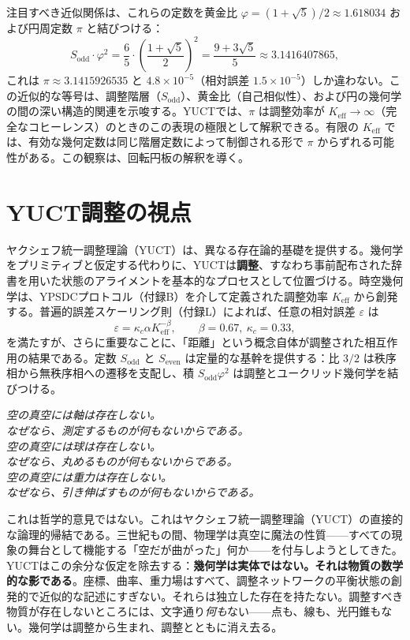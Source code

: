 \documentclass[12pt,a4paper]{article}
\newcommand{\kappac}{\kappa_c}
\newcommand{\eps}{\varepsilon}
\newcommand{\betaf}{\beta}
\newcommand{\Sodd}{S_{\mathrm{odd}}}
\newcommand{\Seven}{S_{\mathrm{even}}}
\begin{document}
	注目すべき近似関係は、これらの定数を黄金比 \(\varphi = (1+\sqrt{5})/2 \approx 1.618034\) および円周定数 \(\pi\) と結びつける：
	\begin{equation}
		\Sodd \cdot \varphi^2 = \frac{6}{5} \cdot \left(\frac{1+\sqrt{5}}{2}\right)^2 = \frac{9+3\sqrt{5}}{5} \approx 3.1416407865,
	\end{equation}
	これは \(\pi \approx 3.1415926535\) と \(4.8\times10^{-5}\)（相対誤差 \(1.5\times10^{-5}\)）しか違わない。この近似的な等号は、調整階層（\(\Sodd\)）、黄金比（自己相似性）、および円の幾何学の間の深い構造的関連を示唆する。YUCTでは、\(\pi\) は調整効率が \(K_{\mathrm{eff}} \to \infty\)（完全なコヒーレンス）のときのこの表現の極限として解釈できる。有限の \(K_{\mathrm{eff}}\) では、有効な幾何定数は同じ階層定数によって制御される形で \(\pi\) からずれる可能性がある。この観察は、回転円板の解釈を導く。
	
	\section{YUCT調整の視点}
	\label{sec:yuct}
	
	ヤクシェフ統一調整理論（YUCT）は、異なる存在論的基礎を提供する。幾何学をプリミティブと仮定する代わりに、YUCTは\textbf{調整}、すなわち事前配布された辞書を用いた状態のアライメントを基本的なプロセスとして位置づける。時空幾何学は、YPSDCプロトコル（付録B）を介して定義された調整効率 \(K_{\mathrm{eff}}\) から創発する。普遍的誤差スケーリング則（付録L）によれば、任意の相対誤差 \(\eps\) は
	\[
	\eps = \kappac \alpha K_{\mathrm{eff}}^{-\betaf}, \qquad \betaf = 0.67,\ \kappac = 0.33,
	\]
	を満たすが、さらに重要なことに、「距離」という概念自体が調整された相互作用の結果である。定数 \(\Sodd\) と \(\Seven\) は定量的な基幹を提供する：比 \(3/2\) は秩序相から無秩序相への遷移を支配し、積 \(\Sodd\varphi^2\) は調整とユークリッド幾何学を結びつける。
	
	\begin{tcolorbox}[
		title={\bfseries 論理的に初等的なステートメント},
		colback=blue!3!white,
		colframe=blue!50!black,
		fonttitle=\bfseries,
		sharp corners
		]
		\small
		\textit{空の真空には軸は存在しない。\\なぜなら、測定するものが何もないからである。\\空の真空には球は存在しない。\\なぜなら、丸めるものが何もないからである。\\空の真空には重力は存在しない。\\なぜなら、引き伸ばすものが何もないからである。}
		
		\medskip
		これは哲学的意見ではない。これはヤクシェフ統一調整理論（YUCT）の直接的な論理的帰結である。三世紀もの間、物理学は真空に魔法の性質——すべての現象の舞台として機能する「空だが曲がった」何か——を付与しようとしてきた。YUCTはこの余分な仮定を除去する：\textbf{幾何学は実体ではない。それは物質の数学的な影である}。座標、曲率、重力場はすべて、調整ネットワークの平衡状態の創発的で近似的な記述にすぎない。それらは独立した存在を持たない。調整すべき物質が存在しないところには、文字通り\textit{何も}ない——点も、線も、光円錐もない。幾何学は調整から生まれ、調整とともに消え去る。
	\end{tcolorbox}
	
\end{document}
